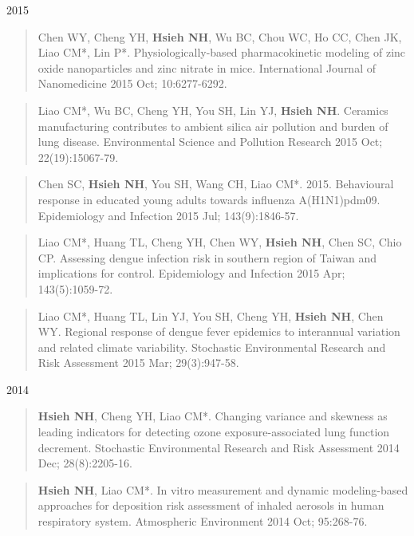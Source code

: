 \documentclass[10pt,]{article}
\begin{document}
2015

\begin{quote}
Chen WY, Cheng YH, \textbf{Hsieh NH}, Wu BC, Chou WC, Ho CC, Chen JK,
Liao CM*, Lin P*. Physiologically-based pharmacokinetic modeling of zinc
oxide nanoparticles and zinc nitrate in mice. International Journal of
Nanomedicine 2015 Oct; 10:6277-6292.
\end{quote}

\begin{quote}
Liao CM*, Wu BC, Cheng YH, You SH, Lin YJ, \textbf{Hsieh NH}. Ceramics
manufacturing contributes to ambient silica air pollution and burden of
lung disease. Environmental Science and Pollution Research 2015 Oct;
22(19):15067-79.
\end{quote}

\begin{quote}
Chen SC, \textbf{Hsieh NH}, You SH, Wang CH, Liao CM*. 2015. Behavioural
response in educated young adults towards influenza A(H1N1)pdm09.
Epidemiology and Infection 2015 Jul; 143(9):1846-57.
\end{quote}

\begin{quote}
Liao CM*, Huang TL, Cheng YH, Chen WY, \textbf{Hsieh NH}, Chen SC, Chio
CP. Assessing dengue infection risk in southern region of Taiwan and
implications for control. Epidemiology and Infection 2015 Apr;
143(5):1059-72.
\end{quote}

\begin{quote}
Liao CM*, Huang TL, Lin YJ, You SH, Cheng YH, \textbf{Hsieh NH}, Chen
WY. Regional response of dengue fever epidemics to interannual variation
and related climate variability. Stochastic Environmental Research and
Risk Assessment 2015 Mar; 29(3):947-58.
\end{quote}

2014

\begin{quote}
\textbf{Hsieh NH}, Cheng YH, Liao CM*. Changing variance and skewness as
leading indicators for detecting ozone exposure-associated lung function
decrement. Stochastic Environmental Research and Risk Assessment 2014
Dec; 28(8):2205-16.
\end{quote}

\begin{quote}
\textbf{Hsieh NH}, Liao CM*. In vitro measurement and dynamic
modeling-based approaches for deposition risk assessment of inhaled
aerosols in human respiratory system. Atmospheric Environment 2014 Oct;
95:268-76.
\end{quote}
\end{document}
